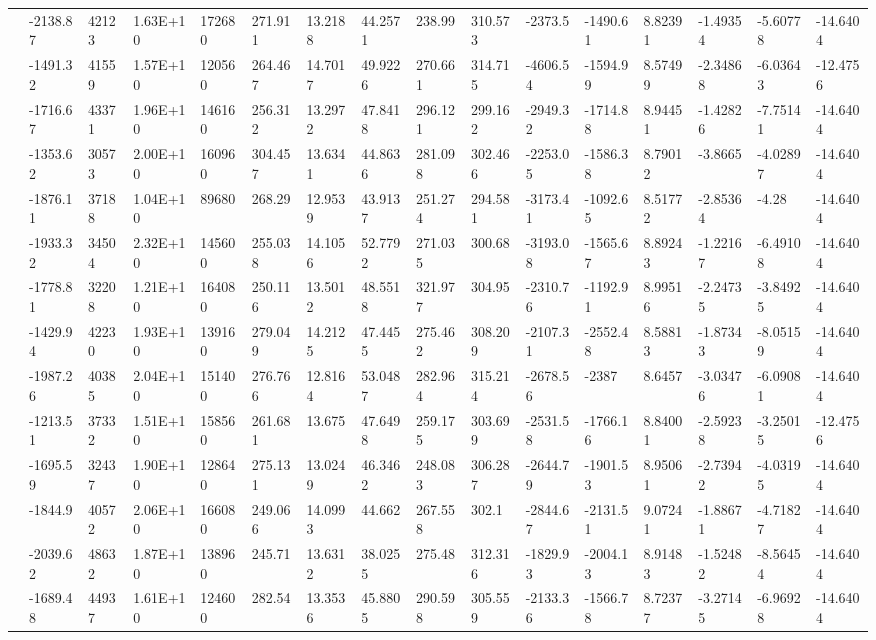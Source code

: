 \documentclass[paper=a4, fontsize=11pt]{scrartcl}
\numberwithin{equation}{section}
\numberwithin{figure}{section}
\numberwithin{table}{section}
\begin{document}
{{\begin{tabular}{l || l | l | l | l | l | l | l | l | l | l | l | l | l | l | l}
    & -2138.87 & 42123 & 1.63E+10 & 172680 & 271.911 & 13.2188 & 44.2571 & 238.99 & 310.573 & -2373.5 & -1490.61 & 8.82391 & -1.49354 & -5.60778 & -14.6404 \\
    & -1491.32 & 41559 & 1.57E+10 & 120560 & 264.467 & 14.7017 & 49.9226 & 270.661 & 314.715 & -4606.54 & -1594.99 & 8.57499 & -2.34868 & -6.03643 & -12.4756 \\
    & -1716.67 & 43371 & 1.96E+10 & 146160 & 256.312 & 13.2972 & 47.8418 & 296.121 & 299.162 & -2949.32 & -1714.88 & 8.94451 & -1.42826 & -7.75141 & -14.6404 \\
    & -1353.62 & 30573 & 2.00E+10 & 160960 & 304.457 & 13.6341 & 44.8636 & 281.098 & 302.466 & -2253.05 & -1586.38 & 8.79012 & -3.8665 & -4.02897 & -14.6404 \\
    & -1876.11 & 37188 & 1.04E+10 & 89680 & 268.29 & 12.9539 & 43.9137 & 251.274 & 294.581 & -3173.41 & -1092.65 & 8.51772 & -2.85364 & -4.28 & -14.6404 \\
    & -1933.32 & 34504 & 2.32E+10 & 145600 & 255.038 & 14.1056 & 52.7792 & 271.035 & 300.68 & -3193.08 & -1565.67 & 8.89243 & -1.22167 & -6.49108 & -14.6404 \\
    & -1778.81 & 32208 & 1.21E+10 & 164080 & 250.116 & 13.5012 & 48.5518 & 321.977 & 304.95 & -2310.76 & -1192.91 & 8.99516 & -2.24735 & -3.84925 & -14.6404 \\
    & -1429.94 & 42230 & 1.93E+10 & 139160 & 279.049 & 14.2125 & 47.4455 & 275.462 & 308.209 & -2107.31 & -2552.48 & 8.58813 & -1.87343 & -8.05159 & -14.6404 \\
    & -1987.26 & 40385 & 2.04E+10 & 151400 & 276.766 & 12.8164 & 53.0487 & 282.964 & 315.214 & -2678.56 & -2387 & 8.6457 & -3.03476 & -6.09081 & -14.6404 \\
    & -1213.51 & 37332 & 1.51E+10 & 158560 & 261.681 & 13.675 & 47.6498 & 259.175 & 303.699 & -2531.58 & -1766.16 & 8.84001 & -2.59238 & -3.25015 & -12.4756 \\
    & -1695.59 & 32437 & 1.90E+10 & 128640 & 275.131 & 13.0249 & 46.3462 & 248.083 & 306.287 & -2644.79 & -1901.53 & 8.95061 & -2.73942 & -4.03195 & -14.6404 \\
    & -1844.9 & 40572 & 2.06E+10 & 166080 & 249.066 & 14.0993 & 44.662 & 267.558 & 302.1 & -2844.67 & -2131.51 & 9.07241 & -1.88671 & -4.71827 & -14.6404 \\
    & -2039.62 & 48632 & 1.87E+10 & 138960 & 245.71 & 13.6312 & 38.0255 & 275.48 & 312.316 & -1829.93 & -2004.13 & 8.91483 & -1.52482 & -8.56454 & -14.6404 \\
    & -1689.48 & 44937 & 1.61E+10 & 124600 & 282.54 & 13.3536 & 45.8805 & 290.598 & 305.559 & -2133.36 & -1566.78 & 8.72377 & -3.27145 & -6.96928 & -14.6404 \\

\end{tabular}}}
\end{document}
